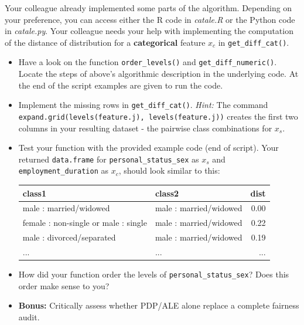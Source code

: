 {\begin{enumerate}[a)]
Your colleague already implemented some parts of the algorithm. Depending on your 
preference, you can access either the R code in \textit{catale.R} or the 
Python code in \textit{catale.py}.
Your colleague needs your help with implementing the computation of the distance of 
distribution for a \textbf{categorical} feature $x_c$ in 
\texttt{get\_diff\_cat()}. 

\begin{itemize}
  \item Have a look on the function \texttt{order\_levels()} and \texttt{get\_diff\_numeric()}. 
  Locate the steps of above's  algorithmic description in the underlying code.
  At the end of the script examples are given to run the code. 
  \item Implement the missing rows in \texttt{get\_diff\_cat()}.
  \textit{Hint:} The command \texttt{expand.grid(levels(feature.j), levels(feature.j))} creates the first two columns in 
your resulting dataset - the pairwise class combinations for $x_s$.
  \item Test your function with the provided example code (end of script). 
  Your returned \texttt{data.frame} for \texttt{personal\_status\_sex} as $x_s$ 
  and \texttt{employment\_duration} as $x_c$, should look 
  similar to this: 

\begin{table}[ht]
\centering
\begin{tabular}{llr}
  \hline
 class1 & class2 & dist \\ 
  \hline
male : married/widowed & male : married/widowed & 0.00 \\ 
female : non-single or male : single & male : married/widowed & 0.22 \\ 
male : divorced/separated & male : married/widowed & 0.19 \\ 
  ... & ... & ... \\
   \hline
\end{tabular}
\end{table}

\item How did your function order the levels of \texttt{personal\_status\_sex}? 
Does this order make sense to you? 

\item \textbf{Bonus:} Critically assess whether PDP/ALE alone replace a complete fairness audit.

\end{itemize}
\end{enumerate}
}